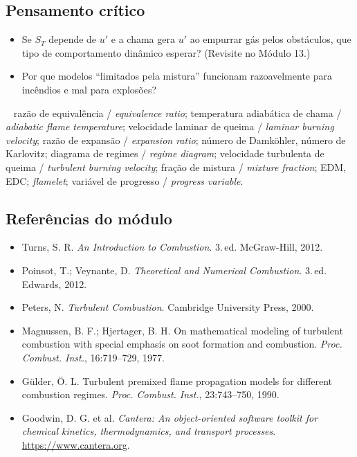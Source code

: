 \documentclass[10pt,a4paper,twocolumn,openany]{report}
\newcommand{\lead}[2]{\par\medskip\noindent{\color{#1}\bfseries #2}\ }
\newenvironment{critico}{\subsection*{\textcolor{roxo}{Pensamento crítico}}}{\par}
\newenvironment{chaves}{\lead{cinza}{Palavras-chave (PT/EN):}\small}{\par}
\newenvironment{refs}{\subsection*{Referências do módulo}\small}{\par}
\begin{document}
\begin{critico}
\begin{itemize}
  \item Se $S_T$ depende de $u'$ e a chama gera $u'$ ao empurrar gás pelos
        obstáculos, que tipo de comportamento dinâmico esperar? (Revisite no
        Módulo 13.)
  \item Por que modelos ``limitados pela mistura'' funcionam razoavelmente
        para incêndios e mal para explosões?
\end{itemize}
\end{critico}

\begin{chaves}
razão de equivalência / \emph{equivalence ratio}; temperatura adiabática de
chama / \emph{adiabatic flame temperature}; velocidade laminar de queima /
\emph{laminar burning velocity}; razão de expansão / \emph{expansion ratio};
número de Damköhler, número de Karlovitz; diagrama de regimes /
\emph{regime diagram}; velocidade turbulenta de queima / \emph{turbulent
burning velocity}; fração de mistura / \emph{mixture fraction}; EDM, EDC;
\emph{flamelet}; variável de progresso / \emph{progress variable}.
\end{chaves}

\begin{refs}
\begin{itemize}
  \item Turns, S. R. \emph{An Introduction to Combustion}. 3.\,ed. McGraw-Hill, 2012.
  \item Poinsot, T.; Veynante, D. \emph{Theoretical and Numerical Combustion}. 3.\,ed. Edwards, 2012.
  \item Peters, N. \emph{Turbulent Combustion}. Cambridge University Press, 2000.
  \item Magnussen, B. F.; Hjertager, B. H. On mathematical modeling of turbulent combustion with special emphasis on soot formation and combustion. \emph{Proc. Combust. Inst.}, 16:719--729, 1977.
  \item Gülder, Ö. L. Turbulent premixed flame propagation models for different combustion regimes. \emph{Proc. Combust. Inst.}, 23:743--750, 1990.
  \item Goodwin, D. G. et al. \emph{Cantera: An object-oriented software toolkit for chemical kinetics, thermodynamics, and transport processes}. \url{https://www.cantera.org}.
\end{itemize}
\end{refs}
\end{document}
